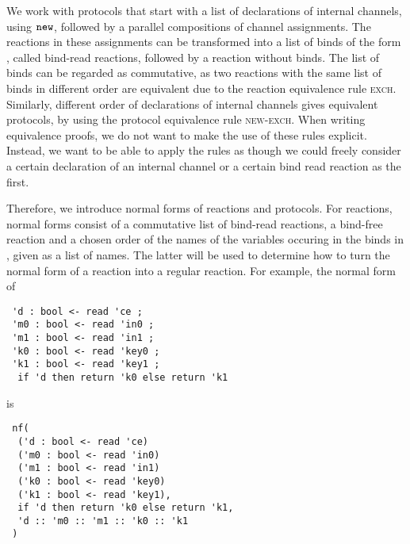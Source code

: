 We work with protocols that start with a list of declarations of 
internal channels, using $\texttt{new}$, followed by a parallel compositions of channel assignments. The reactions in these
assignments can be transformed into a list of binds of the form
,
called bind-read reactions, followed by a reaction without binds.
The list of binds can be regarded as commutative, 
as two reactions with the same list of binds in different order
are equivalent due to the reaction equivalence rule \textsc{exch}.
Similarly, different order of declarations of internal channels gives
equivalent protocols, by using the protocol equivalence rule
\textsc{new-exch}. When writing equivalence proofs, we do not want to 
make the use of these rules explicit. Instead, we want to be able to apply
the rules as though we could freely consider a certain declaration of an 
internal channel or a certain bind read reaction as the first.

Therefore, we introduce normal forms of reactions and protocols. 
For reactions, normal forms 
consist of a commutative list  of bind-read reactions,
a bind-free reaction 
and a chosen order  of the names of the variables occuring in
the binds in , given as a list of names.
The latter will be used to determine how to turn the normal form 
of a reaction into a regular reaction.
For example, the normal form of
\begin{lstlisting}
 'd : bool <- read 'ce ;
 'm0 : bool <- read 'in0 ; 
 'm1 : bool <- read 'in1 ;
 'k0 : bool <- read 'key0 ;
 'k1 : bool <- read 'key1 ;
  if 'd then return 'k0 else return 'k1
\end{lstlisting}
is
\begin{lstlisting}
 nf(
  ('d : bool <- read 'ce)
  ('m0 : bool <- read 'in0) 
  ('m1 : bool <- read 'in1)
  ('k0 : bool <- read 'key0)
  ('k1 : bool <- read 'key1),
  if 'd then return 'k0 else return 'k1,
  'd :: 'm0 :: 'm1 :: 'k0 :: 'k1
 )
\end{lstlisting}
 
